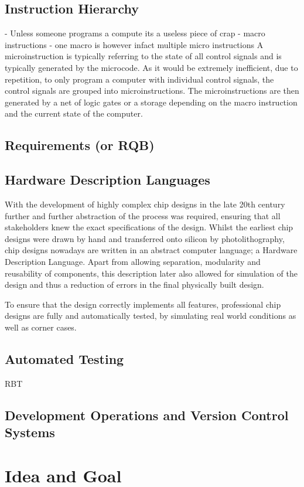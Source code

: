 \subsection{Instruction Hierarchy}
- Unless someone programs a compute its a useless piece of crap
- macro instructions
- one macro is however infact multiple micro instructions 
A microinstruction is typically referring to the state of all control signals and is typically generated by the microcode. As it would be extremely inefficient, due to repetition, to only program a computer with individual control signals, the control signals are grouped into microinstructions. The microinstructions are then generated by a net of logic gates or a storage depending on the macro instruction and the current state of the computer.


\subsection{Requirements (or RQB)}
\subsection{Hardware Description Languages}
With the development of highly complex chip designs in the late 20th century further and further abstraction of the process was required, ensuring that all stakeholders knew the exact specifications of the design. \cite{1214355} Whilst the earliest chip designs were drawn by hand and transferred onto silicon by photolithography, chip designs nowadays are written in an abstract computer language; a Hardware Description Language. Apart from allowing separation, modularity and reusability of components, this description later also allowed for simulation of the design and thus a reduction of errors in the final physically built design. 

To ensure that the design correctly implements all features, professional chip designs are fully and automatically tested, by simulating real world conditions as well as corner cases. 
\subsection{Automated Testing}
RBT

\subsection{Development Operations and Version Control Systems}

\section{Idea and Goal}


